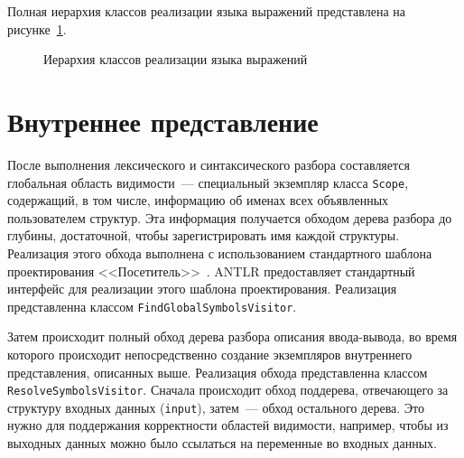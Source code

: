 \documentclass[times,specification,annotation]{style/itmo-student-thesis/itmo-student-thesis}
\begin{document}
Полная иерархия классов реализации языка выражений представлена на рисунке~\ref{pl-classes-hierarchy}.

\begin{figure}[!h]
\caption{Иерархия классов реализации языка выражений}\label{pl-classes-hierarchy}
\centering
{}%

\end{figure}

\section{Внутреннее представление}

После выполнения лексического и синтаксического разбора составляется глобальная область видимости~--- специальный экземпляр класса \texttt{Scope}, содержащий, в том числе, информацию об именах всех объявленных пользователем структур. Эта информация получается обходом дерева разбора до глубины, достаточной, чтобы зарегистрировать имя каждой структуры. Реализация этого обхода выполнена с использованием стандартного шаблона проектирования <<Посетитель>>~\cite{design-patterns}. ANTLR предоставляет стандартный интерфейс для реализации этого шаблона проектирования. Реализация представленна классом \texttt{FindGlobalSymbolsVisitor}.

Затем происходит полный обход дерева разбора описания ввода-вывода, во время которого происходит непосредственно создание экземпляров внутреннего представления, описанных выше. Реализация обхода представленна классом \texttt{ResolveSymbolsVisitor}. Сначала происходит обход поддерева, отвечающего за структуру входных данных (\texttt{input}), затем~--- обход остального дерева. Это нужно для поддержания корректности областей видимости, например, чтобы из выходных данных можно было ссылаться на переменные во входных данных.
\end{document}
